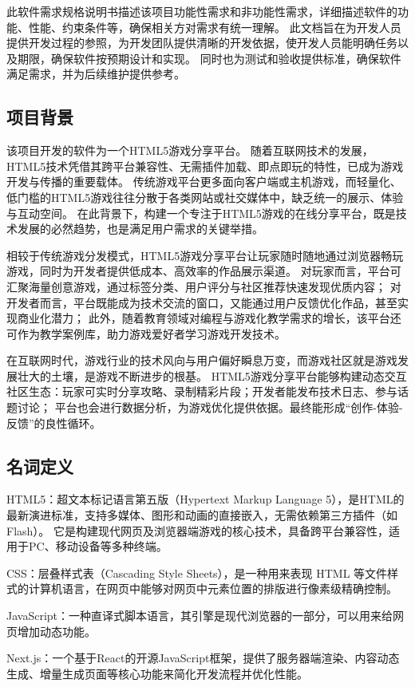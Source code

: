 \documentclass[12pt]{ctexart} %
\begin{document}
此软件需求规格说明书描述该项目功能性需求和非功能性需求，详细描述软件的功能、性能、约束条件等，确保相关方对需求有统一理解。
此文档旨在为开发人员提供开发过程的参照，为开发团队提供清晰的开发依据，使开发人员能明确任务以及期限，确保软件按预期设计和实现。
同时也为测试和验收提供标准，确保软件满足需求，并为后续维护提供参考。

\subsection{项目背景}
该项目开发的软件为一个HTML5游戏分享平台。
随着互联网技术的发展，HTML5技术凭借其跨平台兼容性、无需插件加载、即点即玩的特性，已成为游戏开发与传播的重要载体。
传统游戏平台更多面向客户端或主机游戏，而轻量化、低门槛的HTML5游戏往往分散于各类网站或社交媒体中，缺乏统一的展示、体验与互动空间。
在此背景下，构建一个专注于HTML5游戏的在线分享平台，既是技术发展的必然趋势，也是满足用户需求的关键举措。

相较于传统游戏分发模式，HTML5游戏分享平台让玩家随时随地通过浏览器畅玩游戏，同时为开发者提供低成本、高效率的作品展示渠道。
对玩家而言，平台可汇聚海量创意游戏，通过标签分类、用户评分与社区推荐快速发现优质内容；
对开发者而言，平台既能成为技术交流的窗口，又能通过用户反馈优化作品，甚至实现商业化潜力；
此外，随着教育领域对编程与游戏化教学需求的增长，该平台还可作为教学案例库，助力游戏爱好者学习游戏开发技术。

在互联网时代，游戏行业的技术风向与用户偏好瞬息万变，而游戏社区就是游戏发展壮大的土壤，是游戏不断进步的根基。
HTML5游戏分享平台能够构建动态交互社区生态：玩家可实时分享攻略、录制精彩片段；开发者能发布技术日志、参与话题讨论；
平台也会进行数据分析，为游戏优化提供依据。最终能形成“创作-体验-反馈”的良性循环。


\subsection{名词定义}
HTML5：超文本标记语言第五版（Hypertext Markup Language 5），是HTML的最新演进标准，支持多媒体、图形和动画的直接嵌入，无需依赖第三方插件（如Flash）。
它是构建现代网页及浏览器端游戏的核心技术，具备跨平台兼容性，适用于PC、移动设备等多种终端。

CSS：层叠样式表（Cascading Style Sheets），是一种用来表现 HTML 等文件样式的计算机语言，在网页中能够对网页中元素位置的排版进行像素级精确控制。

JavaScript：一种直译式脚本语言，其引擎是现代浏览器的一部分，可以用来给网页增加动态功能。

Next.js：一个基于React的开源JavaScript框架，提供了服务器端渲染、内容动态生成、增量生成页面等核心功能来简化开发流程并优化性能。
\end{document}
